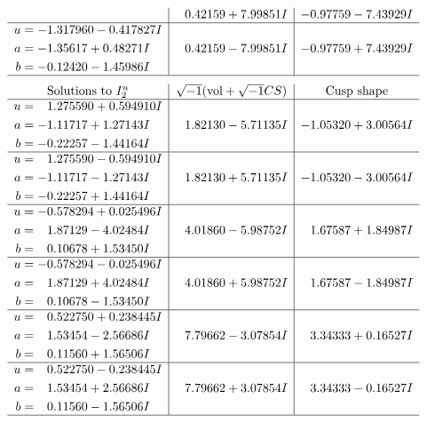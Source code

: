 \documentclass[1p]{elsarticle_modified}
\theoremstyle{definition}
\newcommand{\I}{\sqrt{-1}}
\begin{document}
$$\begin{array}{c|c|c}
 & \phantom{-}0.42159 + 7.99851 I & -0.97759 - 7.43929 I \\ \hline\begin{aligned}
u &= -1.317960 - 0.417827 I \\
a &= -1.35617 + 0.48271 I \\
b &= -0.12420 - 1.45986 I\end{aligned}
 & \phantom{-}0.42159 - 7.99851 I & -0.97759 + 7.43929 I\\
 \hline 
 \end{array}$$\newpage$$\begin{array}{c|c|c}  
\text{Solutions to }I^u_{2}& \I (\text{vol} + \sqrt{-1}CS) & \text{Cusp shape}\\
 \hline 
\begin{aligned}
u &= \phantom{-}1.275590 + 0.594910 I \\
a &= -1.11717 + 1.27143 I \\
b &= -0.22257 - 1.44164 I\end{aligned}
 & \phantom{-}1.82130 - 5.71135 I & -1.05320 + 3.00564 I \\ \hline\begin{aligned}
u &= \phantom{-}1.275590 - 0.594910 I \\
a &= -1.11717 - 1.27143 I \\
b &= -0.22257 + 1.44164 I\end{aligned}
 & \phantom{-}1.82130 + 5.71135 I & -1.05320 - 3.00564 I \\ \hline\begin{aligned}
u &= -0.578294 + 0.025496 I \\
a &= \phantom{-}1.87129 - 4.02484 I \\
b &= \phantom{-}0.10678 + 1.53450 I\end{aligned}
 & \phantom{-}4.01860 - 5.98752 I & \phantom{-}1.67587 + 1.84987 I \\ \hline\begin{aligned}
u &= -0.578294 - 0.025496 I \\
a &= \phantom{-}1.87129 + 4.02484 I \\
b &= \phantom{-}0.10678 - 1.53450 I\end{aligned}
 & \phantom{-}4.01860 + 5.98752 I & \phantom{-}1.67587 - 1.84987 I \\ \hline\begin{aligned}
u &= \phantom{-}0.522750 + 0.238445 I \\
a &= \phantom{-}1.53454 - 2.56686 I \\
b &= \phantom{-}0.11560 + 1.56506 I\end{aligned}
 & \phantom{-}7.79662 - 3.07854 I & \phantom{-}3.34333 + 0.16527 I \\ \hline\begin{aligned}
u &= \phantom{-}0.522750 - 0.238445 I \\
a &= \phantom{-}1.53454 + 2.56686 I \\
b &= \phantom{-}0.11560 - 1.56506 I\end{aligned}
 & \phantom{-}7.79662 + 3.07854 I & \phantom{-}3.34333 - 0.16527 I\\
 \hline 
 \end{array}$$\newpage
\end{document}
